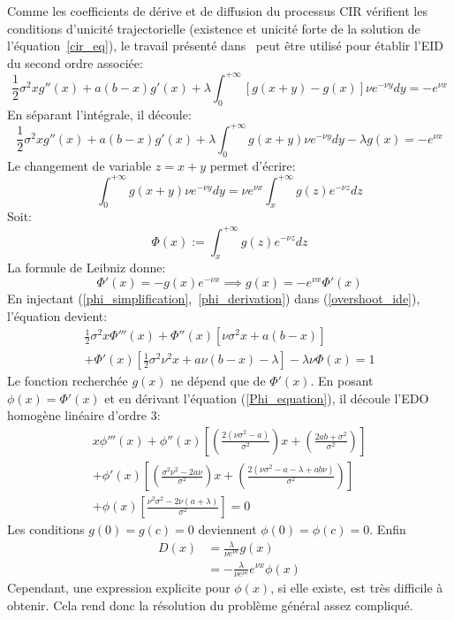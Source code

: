 Comme les coefficients de dérive et de diffusion du processus \acs{CIR} vérifient les conditions d'unicité trajectorielle (existence et unicité forte de la solution de l'équation~\ref{cir_eq}), le travail présenté dans~\cite{abundo2013} peut être utilisé pour établir l'\acs{EID} du second ordre associée:
\begin{equation}\label{initial_overshoot_ide}
    \frac{1}{2}\sigma^2xg''(x)+a(b-x)g'(x)+\lambda\int_0^{+\infty}\left[g(x+y)-g(x)\right]\nu e^{-\nu y}dy=-e^{\nu x}
\end{equation}
En séparant l'intégrale, il découle:
\begin{equation}\label{overshoot_ide}
        \frac{1}{2}\sigma^2xg''(x)+a(b-x)g'(x)+\lambda\int_0^{+\infty}g(x+y)\nu e^{-\nu y}dy-\lambda g(x)=-e^{\nu x}
\end{equation}
Le changement de variable $z=x+y$ permet d'écrire:
\[
\int_0^{+\infty}g(x+y)\nu e^{-\nu y}dy=\nu e^{\nu x}\int_x^{+\infty}g(z)e^{-\nu z}dz
\]
Soit:
\begin{equation}\label{phi_simplification}
    \Phi(x):=\int_x^{+\infty}g(z)e^{-\nu z}dz
\end{equation}
La formule de Leibniz donne:
\begin{equation}\label{phi_derivation}
        \Phi'(x)=-g(x)e^{-\nu x}\implies g(x)=-e^{\nu x}\Phi'(x)
\end{equation}
En injectant (\ref{phi_simplification},~\ref{phi_derivation}) dans (\ref{overshoot_ide}), l'équation devient:
\begin{equation}\label{Phi_equation}
    \begin{aligned}
        \frac{1}{2}\sigma^2x\Phi'''(x)+\Phi''(x)\left[\nu\sigma^2x+a(b-x)\right]\\+\Phi'(x)\left[\frac{1}{2}\sigma^2\nu^2x+a\nu(b-x)-\lambda\right]-\lambda\nu \Phi(x)=1
    \end{aligned}
\end{equation}
Le fonction recherchée $g(x)$ ne dépend que de $\Phi'(x)$. En posant $\phi(x)=\Phi'(x)$ et en dérivant l'équation (\ref{Phi_equation}), il découle l'\acs{EDO} homogène linéaire d'ordre 3:
\begin{equation}\label{phi_equation}
    \begin{aligned}
        x \phi'''(x)+\phi''(x) \left[\left(\frac{2(\nu\sigma^2-a)}{\sigma^2}\right)x+\left(\frac{2ab+\sigma^2}{\sigma^2}\right)\right]\\+\phi'(x) \left[\left(\frac{\sigma^2\nu^2-2a\nu}{\sigma^2}\right)x+\left(\frac{2(\nu\sigma^2-a-\lambda+ab\nu)}{\sigma^2}\right)\right]\\+\phi(x) \left[\frac{\nu^2  \sigma ^2-2\nu(a+\lambda )}{\sigma^2}\right]=0
    \end{aligned}
\end{equation}
Les conditions $g(0)=g(c)=0$ deviennent $\phi(0)=\phi(c)=0$. Enfin
\[
\begin{aligned}
    D(x) &= \frac{\lambda}{\nu e^{\nu c}}g(x)\\
    &=-\frac{\lambda}{\nu e^{\nu c}}e^{\nu x}\phi(x)
\end{aligned}
\]
Cependant, une expression explicite pour $\phi(x)$, si elle existe, est très difficile à obtenir. Cela rend donc la résolution du problème général assez compliqué. 

